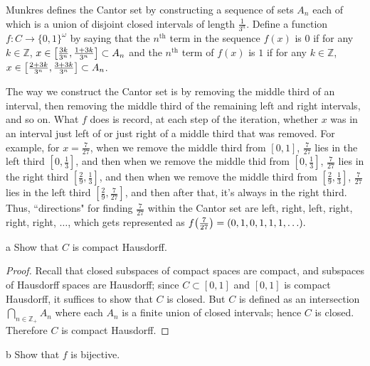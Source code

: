\documentclass[11pt]{article}
\begin{document}
Munkres defines the Cantor set by constructing a sequence of sets $A_n$ each of
which is a union of disjoint closed intervals of length $\frac{1}{3^n}$. Define
a function $f: C \to \{0, 1\}^\omega$ by saying that the $n^{\text{th}}$ term in
the sequence $f(x)$ is $0$ if for any $k \in \mathbb{Z}$, $x \in
\qty[\frac{3k}{3^n}, \frac{1 + 3k}{3^n}] \subset A_n$ and the $n^{\text{th}}$ term
of $f(x)$ is $1$ if for any $k \in \mathbb{Z}$, $x \in \qty[\frac{2 + 3k}{3^n}, \frac{3
+ 3k}{3^n}] \subset A_n$.

The way we construct the Cantor set is by removing the middle third of an
interval, then removing the middle third of the remaining left and right
intervals, and so on. What $f$ does is record, at each step of the iteration,
whether $x$ was in an interval just left of or just right of a middle third that
was removed. For example, for $x = \frac{7}{27}$, when we remove the middle
third from $[0, 1]$, $\frac{7}{27}$ lies in the left third $[0, \frac{1}{3}]$,
and then when we remove the middle thid from $[0, \frac{1}{3}]$, $\frac{7}{27}$
lies in the right third $[\frac{2}{9}, \frac{1}{3}]$, and then when we remove
the middle third from $[\frac{2}{9}, \frac{1}{3}]$, $\frac{7}{27}$ lies in the
left third $[\frac{2}{9}, \frac{7}{27}]$, and then after that, it's always in
the right third. Thus, ``directions" for finding $\frac{7}{27}$ within the
Cantor set are left, right, left, right, right, right, $\ldots$, which gets
represented as $f\qty(\frac{7}{27}) = (0, 1, 0, 1, 1, 1, \ldots).$

\begin{p}{a}
  Show that $C$ is compact Hausdorff.
\end{p}

\begin{proof}
  Recall that closed subspaces of compact spaces are compact, and subspaces of
  Hausdorff spaces are Hausdorff; since $C \subset [0, 1]$ and $[0, 1]$ is
  compact Hausdorff, it suffices to show that $C$ is closed. But $C$ is defined
  as an intersection $\bigcap_{n \in \mathbb{Z}_+} A_n$ where each $A_n$ is a
  finite union of closed intervals; hence $C$ is closed. Therefore $C$ is
  compact Hausdorff.
\end{proof}

\begin{p}{b}
  Show that $f$ is bijective.
\end{p}
\end{document}
